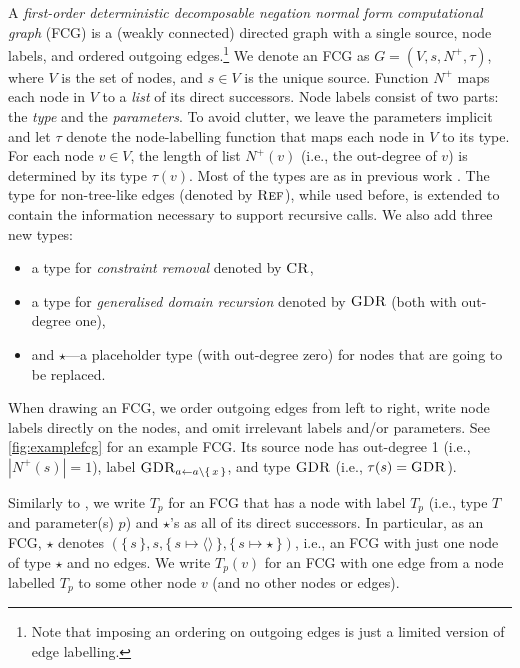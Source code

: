 \documentclass[letterpaper]{article} %
\DeclareMathOperator{\CR}{\textsc{CR}}
\DeclareMathOperator{\GDR}{\textsc{GDR}}
\DeclareMathOperator{\Reff}{\textsc{Ref}}
\theoremstyle{definition}
\theoremstyle{remark}
\begin{document}
A \emph{first-order deterministic decomposable negation normal form
  computational graph} (FCG) is a (weakly connected) directed graph with a
single source, node labels, and ordered outgoing edges.\footnote{Note that
  imposing an ordering on outgoing edges is just a limited version of edge
  labelling.} We denote an FCG as $G = (V, s, N^+, \tau)$, where $V$ is the set
of nodes, and $s \in V$ is the unique source. Function $N^+$ maps each node in
$V$ to a \emph{list} of its direct successors. Node labels consist of two parts:
the \emph{type} and the \emph{parameters}. To avoid clutter, we leave the
parameters implicit and let $\tau$ denote the node-labelling function that maps
each node in $V$ to its type. For each node $v \in V$, the length of list
$N^+(v)$ (i.e., the out-degree of $v$) is determined by its type $\tau(v)$. Most
of the types are as in previous work
\citep{DBLP:conf/nips/Broeck11,DBLP:conf/ijcai/BroeckTMDR11}. The type for
non-tree-like edges (denoted by $\Reff$), while used before, is extended to
contain the information necessary to support recursive calls. We also add three
new types:
\begin{itemize}
  \item a type for \emph{constraint removal} denoted by $\CR$,
  \item a type for \emph{generalised domain recursion} denoted by $\GDR$ (both
        with out-degree one),
  \item and $\star$---a placeholder type (with out-degree zero) for nodes that
        are going to be replaced.
\end{itemize}
When drawing an FCG, we order outgoing edges from left to right, write node
labels directly on the nodes, and omit irrelevant labels and/or parameters. See
\cref{fig:examplefcg} for an example FCG\@. Its source node has out-degree 1
(i.e., $|N^+(s)| = 1$), label $\GDR_{a \gets a \setminus \{\, x \,\}}$, and type
$\GDR$ (i.e., $\tau(s) = \GDR$).

Similarly to \citet{DBLP:conf/ijcai/BroeckTMDR11}, we write $T_p$ for an FCG
that has a node with label $T_p$ (i.e., type $T$ and parameter(s) $p$) and
$\star$'s as all of its direct successors. In particular, as an FCG, $\star$
denotes
$(\{\, s \,\}, s, \{\, s \mapsto \langle\rangle \,\}, \{\, s \mapsto \star \,\})$,
i.e., an FCG with just one node of type $\star$ and no edges. We write $T_p(v)$
for an FCG with one edge from a node labelled $T_{p}$ to some other node $v$
(and no other nodes or edges).
\end{document}
